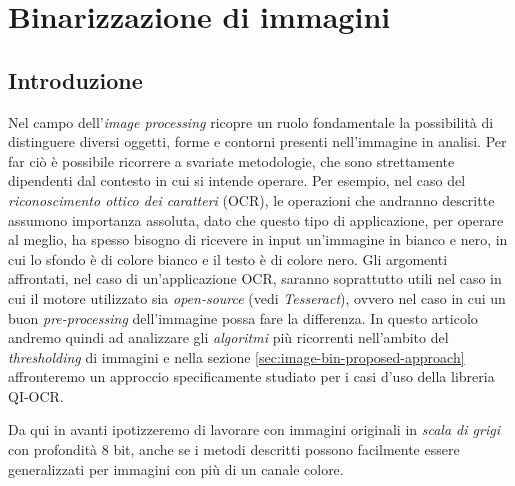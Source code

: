 \chapter{Binarizzazione di immagini}
\label{chap:image-binarization}


\section{Introduzione}
\label{sec:image-bin-intro}
Nel campo dell'\textit{image processing} ricopre un ruolo fondamentale la possibilit\`a di distinguere diversi oggetti, forme e contorni presenti nell'immagine in analisi. Per far ci\`o \`e possibile ricorrere a svariate metodologie, che sono strettamente dipendenti dal contesto in cui si intende operare. Per esempio, nel caso del \textit{riconoscimento ottico dei caratteri} (OCR), le operazioni che andranno descritte assumono importanza assoluta, dato che questo tipo di applicazione, per operare al meglio, ha spesso bisogno di ricevere in input un'immagine in bianco e nero, in cui lo sfondo \`e di colore bianco e il testo \`e di colore nero. Gli argomenti affrontati, nel caso di un'applicazione OCR, saranno soprattutto utili nel caso in cui il motore utilizzato sia \textit{open-source} (vedi \textit{Tesseract}), ovvero nel caso in cui un buon \textit{pre-processing} dell'immagine possa fare la differenza. In questo articolo andremo quindi ad analizzare gli \textit{algoritmi} pi\`u ricorrenti nell'ambito del \textit{thresholding} di immagini e nella sezione \ref{sec:image-bin-proposed-approach} affronteremo un approccio specificamente studiato per i casi d'uso della libreria QI-OCR.

Da qui in avanti ipotizzeremo di lavorare con immagini originali in \textit{scala di grigi} con profondit\`a 8 bit, anche se i metodi descritti possono facilmente essere generalizzati per immagini con pi\`u di un canale colore.


